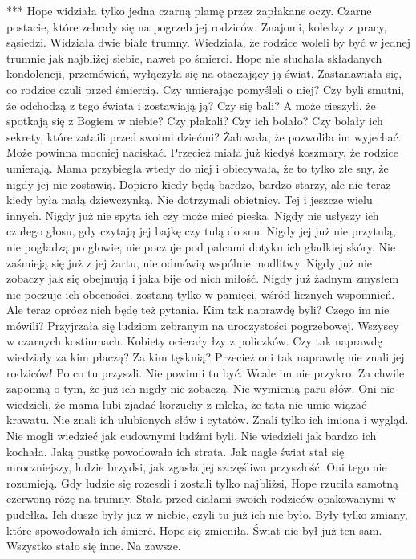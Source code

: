 \documentclass[12pt,a4paper]{book}
\begin{document}
                                            *** 
Hope widziała tylko jedna czarną plamę przez zapłakane oczy. Czarne postacie, które zebrały się na pogrzeb jej rodziców. Znajomi, koledzy z pracy, sąsiedzi. Widziała dwie białe trumny. Wiedziała, że rodzice woleli by być w jednej trumnie jak najbliżej siebie, nawet po śmierci. Hope nie słuchała składanych kondolencji, przemówień, wyłączyła się na otaczający ją świat. Zastanawiała się, co rodzice czuli przed śmiercią. Czy umierając pomyśleli o niej? Czy byli smutni, że odchodzą z tego świata i zostawiają ją? Czy się bali? A może cieszyli, że spotkają się z Bogiem w niebie? Czy płakali? Czy ich bolało? Czy bolały ich sekrety, które zataili przed swoimi dziećmi? 
Żałowała, że pozwoliła im wyjechać. Może powinna mocniej naciskać. Przecież miała już kiedyś koszmary, że rodzice umierają. Mama przybiegła wtedy do niej i obiecywała, że to tylko złe sny, że nigdy jej nie zostawią. Dopiero kiedy będą bardzo, bardzo starzy, ale nie teraz kiedy była małą dziewczynką. Nie dotrzymali obietnicy. Tej i jeszcze wielu innych. Nigdy już nie spyta ich czy może mieć pieska. Nigdy nie usłyszy ich czułego głosu, gdy czytają jej bajkę czy tulą do snu. Nigdy jej już nie przytulą, nie pogładzą po głowie, nie poczuje pod palcami dotyku ich gładkiej skóry. Nie zaśmieją się już z jej żartu, nie odmówią wspólnie modlitwy. Nigdy już nie zobaczy jak się obejmują i jaka bije od nich miłość. Nigdy już żadnym zmysłem nie poczuje ich obecności. zostaną tylko w pamięci, wśród licznych wspomnień. Ale teraz oprócz nich będę też pytania. Kim tak naprawdę byli? Czego im nie mówili? 
Przyjrzała się ludziom zebranym na uroczystości pogrzebowej. Wszyscy w czarnych kostiumach. Kobiety ocierały łzy z policzków. Czy tak naprawdę wiedziały za kim płaczą? Za kim tęsknią? Przecież oni tak naprawdę nie znali jej rodziców! Po co tu przyszli. Nie powinni tu być. Wcale im nie przykro. Za chwile zapomną o tym, że już ich nigdy nie zobaczą. Nie wymienią paru słów. 
Oni nie wiedzieli, że mama lubi zjadać korzuchy z mleka, że tata nie umie wiązać krawatu. Nie znali ich ulubionych słów i cytatów. Znali tylko ich imiona i wygląd. Nie mogli wiedzieć jak cudownymi ludźmi byli. Nie wiedzieli jak bardzo ich kochała. Jaką pustkę powodowała ich strata. Jak nagle świat stał się mroczniejszy, ludzie brzydsi, jak zgasła jej szczęśliwa przyszłość. Oni tego nie rozumieją. 
Gdy ludzie się rozeszli i zostali tylko najbliżsi, Hope rzuciła samotną czerwoną różę na trumny. Stała przed ciałami swoich rodziców opakowanymi w pudełka. Ich dusze były już w niebie, czyli tu już ich nie było. Były tylko zmiany, które spowodowała ich śmierć. Hope się zmieniła. Świat nie był już ten sam. Wszystko stało się inne. Na zawsze.
\end{document}
